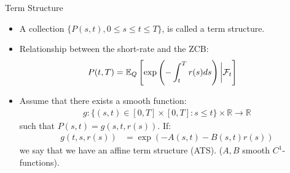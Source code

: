 \documentclass[UKenglish]{beamer}
\newcommand{\E}{\mathbb{E}}  %
\newcommand{\F}{\mathcal{F}} %
\newcommand{\R}{\mathbb{R}}  %
\begin{document}
\begin{frame}{Term Structure}
    \begin{itemize}
        \item A collection $\{P(s,t), 0\leq s \leq t \leq T\}$,  is called a term structure.
        \item Relationship between the short-rate and the ZCB:
        \begin{align*}
        P(t,T) &= \E_{Q}\left[
        \exp\left(
        -\int_{t}^{T}r(s)ds
        \right)\bigg{|}\F_{t}
        \right]    
        \end{align*}
    \item Assume that there exists a smooth function: 
    \begin{align*}
        g:\{(s,t)\in [0,T]\times [0,T]: s\leq t\}\times \R \to \R
    \end{align*}
    such that $P(s,t) = g(s,t,r(s))$. If: 
    \begin{align*}
    g(t,s,r(s)) &= \exp\left(
    -A(s,t)-B(s,t)r(s)
    \right)    
    \end{align*}
    we say that we have an affine term structure (ATS). ($A,B$ smooth $C^{1}$-functions).  
    \end{itemize}
\end{frame}
\end{document}
